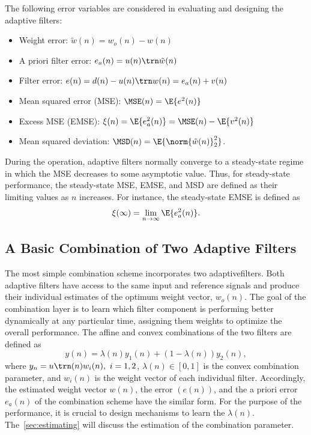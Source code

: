 \documentclass{article}
\begin{document}
The following error variables are considered in evaluating and designing the adaptive filters:
\begin{itemize}
    \item Weight error: $\tilde{w}(n)=w_o(n)-w(n)$
    \item A priori filter error: $e_a(n)=u(n)\trn\tilde{w}(n)$
    \item Filter error: $e(n)=d(n)-u(n)\trn w(n)=e_a(n)+v(n)$
    \item Mean squared error (MSE): $\MSE(n)=\E{e^2(n)}$
    \item Excess MSE (EMSE): $\xi(n)=\E{e_a^2(n)}=\MSE(n)-\E{v^2(n)}$
    \item Mean squared deviation: $\MSD(n)=\E{\norm{\tilde{w}(n)}_2^2}$.
\end{itemize}
During the operation, adaptive filters normally converge to a steady-state regime in which the MSE decreases to some asymptotic value. Thus, for steady-state performance, the steady-state MSE, EMSE, and MSD are defined as their limiting values as $n$ increases. For instance, the steady-state EMSE is defined as
\begin{equation}
    \xi(\infty)=\lim_{n\rightarrow\infty}\E{e_a^2(n)}.
\end{equation}

\subsection{A Basic Combination of Two Adaptive Filters}
The most simple combination scheme incorporates two adaptivefilters.
Both adaptive filters have access to the same input and reference signals and produce their individual estimates of the optimum weight vector, $w_o(n)$.
The goal of the combination layer is to learn which filter component is performing better dynamically at any particular time, assigning them weights to optimize the overall performance.
The affine and convex combinations of the two filters are defined as
\begin{equation}\label{eq:affine_combination}
    y(n)=\lambda(n)y_1(n)+(1-\lambda(n))y_2(n),
\end{equation}
where $y_n=u\trn(n)w_i(n),\ i=1,2$, $\lambda(n) \in [0,1]$ is the convex combination parameter, and $w_i(n)$ is the weight vector of each individual filter. Accordingly, the estimated weight vector $w(n)$, the error $(e(n))$, and the a priori error $e_a(n)$ of the combination scheme have the similar form. For the purpose of the performance, it is crucial to design mechanisms to learn the $\lambda(n)$. The~\cref{sec:estimating} will discuss the estimation of the combination parameter.
\end{document}
